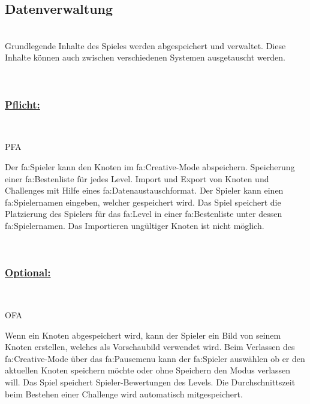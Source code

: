 %
%


\subsection{Datenverwaltung}

%
%
\renewcommand{\K}{}
%
%

~\\
Grundlegende Inhalte des Spieles werden abgespeichert und verwaltet.
Diese Inhalte können auch zwischen verschiedenen Systemen ausgetauscht werden.

~\\

%
%
\subsubsection*{\underline{Pflicht:}}~\\

\begin{ids}{\gls{PFA\K}}

	\id[ 390] Der \gls{fa:Spieler} kann den Knoten im \gls{fa:Creative}-Mode abspeichern.
	\id[ 400]Speicherung einer \gls{fa:Bestenliste} für jedes Level.
	\id[ 410] Import und Export von Knoten und Challenges mit Hilfe eines \gls{fa:Datenaustauschformat}.
	\id[ 420] Der Spieler kann einen \gls{fa:Spielername}n eingeben, welcher gespeichert wird.
	\id[ 430] Das Spiel speichert die Platzierung des Spielers  für das \gls{fa:Level} in einer \gls{fa:Bestenliste} unter dessen \gls{fa:Spielername}n.
	\id[ 440] Das Importieren ungültiger Knoten ist nicht möglich.
	
 	
 	
	
\end{ids}

~\\


%
%
\subsubsection*{\underline{Optional:}}~\\


\begin{ids}{\gls{OFA\K}}

	\id[ 450] Wenn ein Knoten abgespeichert wird, kann der Spieler ein Bild von seinem Knoten erstellen, welches als Vorschaubild verwendet wird.
	\id[ 460] Beim Verlassen des \gls{fa:Creative}-Mode über das \gls{fa:Pausemenu}  kann der \gls{fa:Spieler} auswählen ob er den aktuellen Knoten speichern möchte oder ohne Speichern den Modus verlassen will.
	\id[ 470] Das Spiel speichert Spieler-Bewertungen des Levels.
	\id[ 480] Die Durchschnittszeit beim Bestehen einer Challenge wird automatisch mitgespeichert.
	
 	
 	
	
\end{ids}

~\\